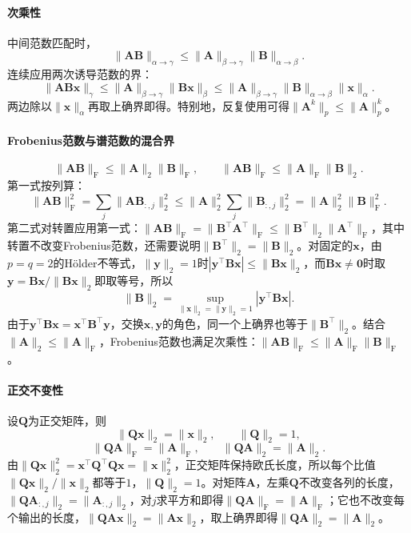 \paragraph{次乘性}
中间范数匹配时，
\[
 \lVert\bm A\bm B\rVert_{\alpha\to\gamma}
 \leq\lVert\bm A\rVert_{\beta\to\gamma}
 \lVert\bm B\rVert_{\alpha\to\beta}.
\]
连续应用两次诱导范数的界：
\[
 \lVert\bm A\bm B\bm x\rVert_\gamma\leq\lVert\bm A\rVert_{\beta\to\gamma}\lVert\bm B\bm x\rVert_\beta\leq\lVert\bm A\rVert_{\beta\to\gamma}\lVert\bm B\rVert_{\alpha\to\beta}\lVert\bm x\rVert_\alpha.
\]
两边除以$\lVert\bm x\rVert_\alpha$再取上确界即得。特别地，反复使用可得$\lVert\bm A^k\rVert_p\leq\lVert\bm A\rVert_p^k$。

\paragraph{Frobenius范数与谱范数的混合界}
\begin{equation}
 \lVert\bm A\bm B\rVert_{\mathrm F}
 \leq\lVert\bm A\rVert_2\lVert\bm B\rVert_{\mathrm F},
 \qquad
 \lVert\bm A\bm B\rVert_{\mathrm F}
 \leq\lVert\bm A\rVert_{\mathrm F}\lVert\bm B\rVert_2.
 \label{eq:matrix-analysis-mixed-submultiplicativity}
\end{equation}
第一式按列算：
\[
 \lVert\bm A\bm B\rVert_{\mathrm F}^2=\sum_j\lVert\bm A\bm B_{:,j}\rVert_2^2\leq\lVert\bm A\rVert_2^2\sum_j\lVert\bm B_{:,j}\rVert_2^2=\lVert\bm A\rVert_2^2\lVert\bm B\rVert_{\mathrm F}^2.
\]
第二式对转置应用第一式：$\lVert\bm A\bm B\rVert_{\mathrm F}=\lVert\bm B^\top\bm A^\top\rVert_{\mathrm F}\leq\lVert\bm B^\top\rVert_2\lVert\bm A^\top\rVert_{\mathrm F}$，其中转置不改变Frobenius范数，还需要说明$\lVert\bm B^\top\rVert_2=\lVert\bm B\rVert_2$。对固定的$\bm x$，由$p=q=2$的Hölder不等式，$\lVert\bm y\rVert_2=1$时$|\bm y^\top\bm B\bm x|\leq\lVert\bm B\bm x\rVert_2$，而$\bm B\bm x\neq\bm0$时取$\bm y=\bm B\bm x/\lVert\bm B\bm x\rVert_2$即取等号，所以
\[
 \lVert\bm B\rVert_2=\sup_{\lVert\bm x\rVert_2=\lVert\bm y\rVert_2=1}|\bm y^\top\bm B\bm x|.
\]
由于$\bm y^\top\bm B\bm x=\bm x^\top\bm B^\top\bm y$，交换$\bm x,\bm y$的角色，同一个上确界也等于$\lVert\bm B^\top\rVert_2$。结合$\lVert\bm A\rVert_2\leq\lVert\bm A\rVert_{\mathrm F}$，Frobenius范数也满足次乘性：$\lVert\bm A\bm B\rVert_{\mathrm F}\leq\lVert\bm A\rVert_{\mathrm F}\lVert\bm B\rVert_{\mathrm F}$。

\paragraph{正交不变性}
设$\bm Q$为正交矩阵，则
\[
 \lVert\bm Q\bm x\rVert_2=\lVert\bm x\rVert_2,\qquad
 \lVert\bm Q\rVert_2=1,
\]
\[
 \lVert\bm Q\bm A\rVert_{\mathrm F}=\lVert\bm A\rVert_{\mathrm F},\qquad
 \lVert\bm Q\bm A\rVert_2=\lVert\bm A\rVert_2.
\]
由$\lVert\bm Q\bm x\rVert_2^2=\bm x^\top\bm Q^\top\bm Q\bm x=\lVert\bm x\rVert_2^2$，正交矩阵保持欧氏长度，所以每个比值$\lVert\bm Q\bm x\rVert_2/\lVert\bm x\rVert_2$都等于$1$，$\lVert\bm Q\rVert_2=1$。对矩阵$\bm A$，左乘$\bm Q$不改变各列的长度，$\lVert\bm Q\bm A_{:,j}\rVert_2=\lVert\bm A_{:,j}\rVert_2$，对$j$求平方和即得$\lVert\bm Q\bm A\rVert_{\mathrm F}=\lVert\bm A\rVert_{\mathrm F}$；它也不改变每个输出的长度，$\lVert\bm Q\bm A\bm x\rVert_2=\lVert\bm A\bm x\rVert_2$，取上确界即得$\lVert\bm Q\bm A\rVert_2=\lVert\bm A\rVert_2$。

